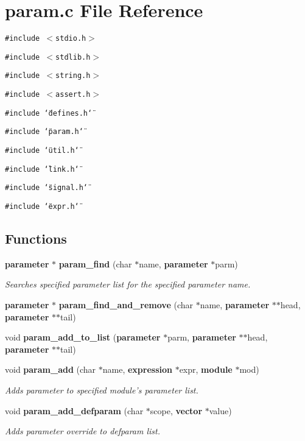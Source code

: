 \section{param.c File Reference}
\label{param_8c}
{\tt \#include $<$stdio.h$>$}\par
{\tt \#include $<$stdlib.h$>$}\par
{\tt \#include $<$string.h$>$}\par
{\tt \#include $<$assert.h$>$}\par
{\tt \#include \char`\"{}defines.h\char`\"{}}\par
{\tt \#include \char`\"{}param.h\char`\"{}}\par
{\tt \#include \char`\"{}util.h\char`\"{}}\par
{\tt \#include \char`\"{}link.h\char`\"{}}\par
{\tt \#include \char`\"{}signal.h\char`\"{}}\par
{\tt \#include \char`\"{}expr.h\char`\"{}}\par
\subsection*{Functions}
\begin{CompactItemize}
\item 
{\bf parameter} $\ast$ {\bf param\_\-find} (char $\ast$name, {\bf parameter} $\ast$parm)
\begin{CompactList}\small\item\em Searches specified parameter list for the specified parameter name.\item\end{CompactList}\item 
{\bf parameter} $\ast$ {\bf param\_\-find\_\-and\_\-remove} (char $\ast$name, {\bf parameter} $\ast$$\ast$head, {\bf parameter} $\ast$$\ast$tail)
\item 
void {\bf param\_\-add\_\-to\_\-list} ({\bf parameter} $\ast$parm, {\bf parameter} $\ast$$\ast$head, {\bf parameter} $\ast$$\ast$tail)
\item 
void {\bf param\_\-add} (char $\ast$name, {\bf expression} $\ast$expr, {\bf module} $\ast$mod)
\begin{CompactList}\small\item\em Adds parameter to specified module's parameter list.\item\end{CompactList}\item 
void {\bf param\_\-add\_\-defparam} (char $\ast$scope, {\bf vector} $\ast$value)
\begin{CompactList}\small\item\em Adds parameter override to defparam list.\item\end{CompactList}\end{CompactItemize}

